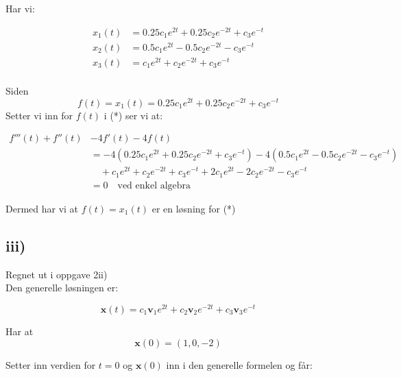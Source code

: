 \documentclass[a4paper, norsk, twoside, 10pt]{article}
\begin{document}
\begin{flushleft}
  Har vi:

  \begin{align*}
    x_{1}(t) &= 0.25c_{1}e^{2t} + 0.25c_{2}e^{-2t} + c_{3}e^{-t} \\
    x_{2}(t) &= 0.5c_{1}e^{2t} - 0.5c_{2}e^{-2t} - c_{3}e^{-t} \\
    x_{3}(t) &=c_{1}e^{2t} + c_{2}e^{-2t} + c_{3}e^{-t} \\
  \end{align*}

  Siden \[f(t) = x_{1}(t)  =0.25c_{1}e^{2t} + 0.25c_{2}e^{-2t} + c_{3}e^{-t}  \]
  Setter vi inn for $f(t)$ i (*) ser vi at:

  \begin{align*}
    f'''(t) +f''(t) &-4f'(t) -4f(t) \\&= -4(0.25c_{1}e^{2t} + 0.25c_{2}e^{-2t} + c_{3}e^{-t}) -4(0.5c_{1}e^{2t} - 0.5c_{2}e^{-2t} - c_{3}e^{-t} )\\ &\quad+ c_{1}e^{2t} + c_{2}e^{-2t} + c_{3}e^{-t} + 2c_{1}e^{2t}  -2c_{2}e^{-2t} - c_{3}e^{-t} \\
    &= 0 \quad \text{ved enkel algebra}
  \end{align*}

  Dermed har vi at $f(t) = x_{1}(t)$ er en løsning for (*)


  \subsection*{iii)}

  Regnet ut i oppgave 2ii)\\ Den generelle løsningen er:
  
\[\mathbf{x}(t) = c_{1}\mathbf{v}_{1}e^{2t} + c_{2}\mathbf{v}_{2}e^{-2t} + c_{3}\mathbf{v}_{3}e^{-t} \]
  

Har at \[\mathbf{x}(0) = (1 , 0 , -2)\]

Setter inn verdien for $t = 0$ og $\mathbf{x}(0)$ inn i den generelle formelen og får:


\end{flushleft}
\end{document}
